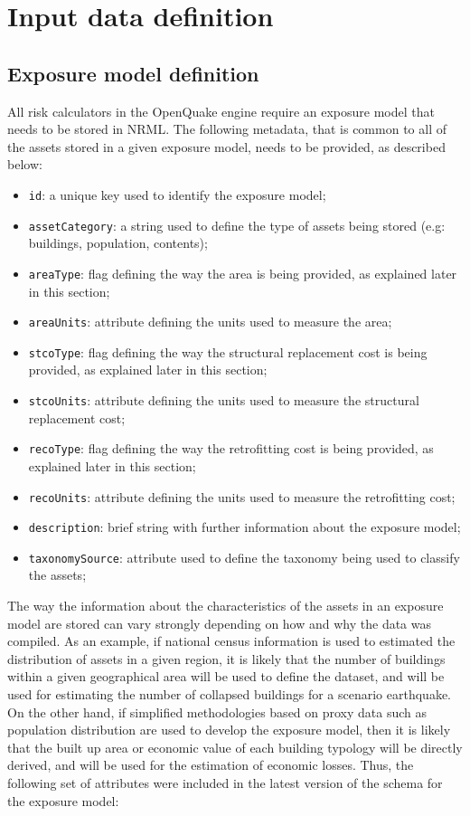 \section{Input data definition}
\subsection{Exposure model definition}
All risk calculators in the OpenQuake engine require an \gls{exposure model} that needs to be stored in NRML. The following metadata, that is common to all of the \glspl{asset} stored in a given \gls{exposure model}, needs to be provided, as described below: 

\begin{itemize}
\item  \Verb+id+: a unique key used to identify the \gls{exposure model};
\item  \Verb+assetCategory+: a string used to define the type of \glspl{asset} being stored (e.g: buildings, population, contents);
\item  \Verb+areaType+: flag defining the way the area is being provided, as explained later in this section; 
\item  \Verb+areaUnits+: attribute defining the units used to measure the area; 
\item  \Verb+stcoType+: flag defining the way the structural replacement cost is being provided, as explained later in this section; 
\item  \Verb+stcoUnits+: attribute defining the units used to measure the structural replacement cost;
\item  \Verb+recoType+: flag defining the way the retrofitting cost is being provided, as explained later in this section; 
\item  \Verb+recoUnits+: attribute defining the units used to measure the retrofitting cost;
\item  \Verb+description+: brief string with further information about the \gls{exposure model};
\item  \Verb+taxonomySource+: attribute used to define the \gls{taxonomy} being used to classify the \glspl{asset};
\end{itemize}

The way the information about the characteristics of the \glspl{asset} in an \gls{exposure model} are stored can vary strongly depending on how and why the data was compiled. As an example, if national census information is used to estimated the distribution of assets in a given region, it is likely that the number of buildings within a given geographical area will be used to define the dataset, and will be used for estimating the number of collapsed buildings for a scenario earthquake. On the other hand, if simplified methodologies based on proxy data such as population distribution are used to develop the exposure model, then it is likely that the built up area or economic value of each building typology will be directly derived, and will be used for the estimation of economic losses. Thus, the following set of attributes were included in the latest version of the schema for the exposure model:


